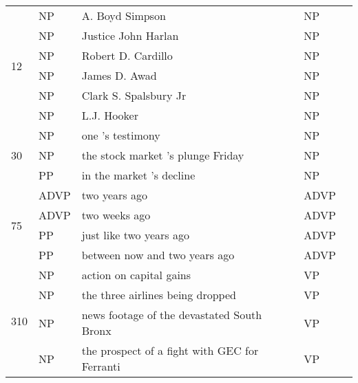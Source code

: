\documentclass[11pt]{article}
\newcommand{\cmark}{\text{\ding{51}}}
\newcommand{\xmark}{\text{\ding{55}}}
\begin{document}
\begin{table*}[t]
\begin{center}
{\begin{tabular}{|l|l|l|l|l|}
\hline
\multirow{6}{*}{12} & NP &                                    A. Boyd Simpson &        NP &    \textcolor{cadmiumgreen}{\cmark} \\
    & NP &                                Justice John Harlan &        NP &    \textcolor{cadmiumgreen}{\cmark} \\
    & NP &                                 Robert D. Cardillo &        NP &    \textcolor{cadmiumgreen}{\cmark} \\
    & NP &                                      James D. Awad &        NP &    \textcolor{cadmiumgreen}{\cmark} \\
    & NP &                              Clark S. Spalsbury Jr &        NP &    \textcolor{cadmiumgreen}{\cmark} \\
    & NP &                                        L.J. Hooker &        NP &    \textcolor{cadmiumgreen}{\cmark} \\
\hline
\multirow{3}{*}{30} & NP &                                   one 's testimony &        NP &    \textcolor{cadmiumgreen}{\cmark} \\
    & NP &                  the stock market 's plunge Friday &        NP &    \textcolor{cadmiumgreen}{\cmark} \\
    & PP &                           in the market 's decline &        NP &   \textcolor{alizarin}{\xmark} \\
\hline
\multirow{4}{*}{75} & ADVP &                                      two years ago &      ADVP &    \textcolor{cadmiumgreen}{\cmark} \\
    & ADVP &                                      two weeks ago &      ADVP &    \textcolor{cadmiumgreen}{\cmark} \\
    & PP &                            just like two years ago &      ADVP &   \textcolor{alizarin}{\xmark} \\
    & PP &                      between now and two years ago &      ADVP &   \textcolor{alizarin}{\xmark} \\
\hline
\multirow{13}{*}{310} & NP &                            action on capital gains &        VP &   \textcolor{alizarin}{\xmark} \\
    & NP &                   the three airlines being dropped &        VP &   \textcolor{alizarin}{\xmark} \\
    & NP &         news footage of the devastated South Bronx &        VP &   \textcolor{alizarin}{\xmark} \\
    & NP &      the prospect of a fight with GEC for Ferranti &        VP &   \textcolor{alizarin}{\xmark} \\

\end{tabular}}
\end{center}
\end{table*}
\end{document}

